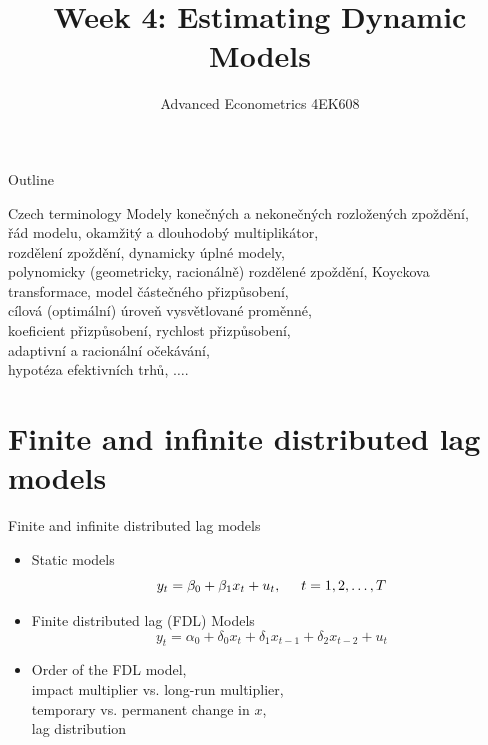 \documentclass{beamer}
\title[Week1]{Week 4:  Estimating Dynamic Models}
\author{Advanced Econometrics 4EK608}
\institute{Vysoká škola ekonomická v Praze}
\date{}
\begin{document}
 
\begin{frame}
  \titlepage
\end{frame}

\begin{frame}{Outline}
  \tableofcontents
\end{frame}


\begin{frame}{Czech terminology}
Modely konečných a nekonečných
rozložených zpoždění, 
\\řád modelu, okamžitý
a dlouhodobý multiplikátor, 
\\ rozdělení zpoždění, dynamicky úplné modely,
\\ polynomicky (geometricky, racionálně)
rozdělené zpoždění, Koyckova transformace,
model částečného přizpůsobení,
\\ cílová (optimální) úroveň vysvětlované proměnné,
\\ koeficient přizpůsobení, rychlost
přizpůsobení, 
\\ adaptivní a racionální očekávání, 
\\ hypotéza efektivních trhů, $\dots$.
\end{frame}


\section{Finite and infinite distributed lag models}
\begin{frame}{Finite and infinite distributed lag models}
\begin{itemize}
\item Static models
$$y_t = \beta_0 + \beta_1 x_t + u_t, \hspace{0.5cm} t=1, 2, \dots, T$$
\item Finite distributed lag (FDL) Models 
$$ y_t = \alpha_0 + \delta_0 x_t + \delta_1 x_{t-1} + \delta_2 x_{t-2} + u_t$$
\item Order of the FDL model, \\impact multiplier vs. long-run multiplier, \\temporary vs. permanent change in $x$, 
\\lag distribution
\end{itemize}
\end{frame}
\end{document}
